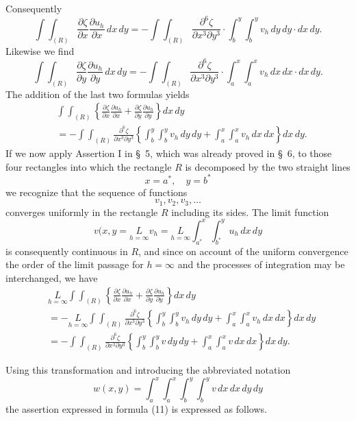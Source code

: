 \documentclass{article}
\begin{document}
Consequently
\[
\int\!\!\int_{(R)} \frac{\partial\zeta}{\partial x} \frac{\partial u_h}{\partial x}\,dx\,dy = -\int\!\!\int_{(R)} \frac{\partial^6\zeta}{\partial x^3 \partial y^3} \cdot \int_b^y \int_b^y v_h\,dy\,dy \cdot dx\,dy.
\]
Likewise we find
\[
\int\!\!\int_{(R)} \frac{\partial\zeta}{\partial y} \frac{\partial u_h}{\partial y}\,dx\,dy = -\int\!\!\int_{(R)} \frac{\partial^6\zeta}{\partial x^3 \partial y^3} \cdot \int_a^x \int_a^x v_h\,dx\,dx \cdot dx\,dy.
\]
The addition of the last two formulas yields
\[
\begin{aligned}
& \int\!\!\int_{(R)} \left\{ \frac{\partial\zeta}{\partial x} \frac{\partial u_h}{\partial x} + \frac{\partial\zeta}{\partial y} \frac{\partial u_h}{\partial y} \right\} dx\,dy \\
&= -\int\!\!\int_{(R)} \frac{\partial^6\zeta}{\partial x^3 \partial y^3} \left\{ \int_b^y \int_b^y v_h\,dy\,dy + \int_a^x \int_a^x v_h\,dx\,dx \right\} dx\,dy.
\end{aligned}
\]
If we now apply Assertion I in §~5, which was already proved in §~6, to those four rectangles into which the rectangle $R$ is decomposed by the two straight lines
\[
x = a^*, \quad y = b^*
\]
we recognize that the sequence of functions
\[
v_1, v_2, v_3, \dots
\]
converges uniformly in the rectangle $R$ including its sides. The limit function
\[
v(x, y = \underset{h=\infty}{L} v_h = \underset{h=\infty}{L} \int_{a^*}^x \int_{b^*}^y u_h\,dx\,dy
\]
is consequently continuous in $R$, and since on account of the uniform convergence the order of the limit passage for $h=\infty$ and the processes of integration may be interchanged, we have
\[
\begin{aligned}
& \underset{h=\infty}{L} \int\!\!\int_{(R)} \left\{ \frac{\partial\zeta}{\partial x} \frac{\partial u_h}{\partial x} + \frac{\partial\zeta}{\partial y} \frac{\partial u_h}{\partial y} \right\} dx\,dy \\
&= -\underset{h=\infty}{L} \int\!\!\int_{(R)} \frac{\partial^6\zeta}{\partial x^3 \partial y^3} \left\{ \int_b^y \int_b^y v_h\,dy\,dy + \int_a^x \int_a^x v_h\,dx\,dx \right\} dx\,dy \\
&= -\int\!\!\int_{(R)} \frac{\partial^6\zeta}{\partial x^3 \partial y^3} \left\{ \int_b^y \int_b^y v\,dy\,dy + \int_a^x \int_a^x v\,dx\,dx \right\} dx\,dy.
\end{aligned}
\]

Using this transformation and introducing the abbreviated notation
\[
w(x, y) = \int_a^x \int_a^x \int_b^y \int_b^y v\,dx\,dx\,dy\,dy
\]
the assertion expressed in formula (11) is expressed as follows.
\end{document}
